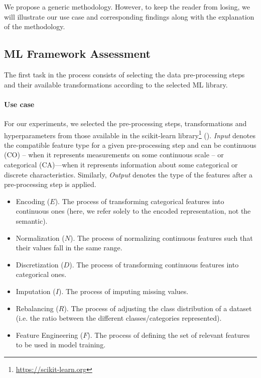 We propose a generic methodology.
However, to keep the reader from losing, we will illustrate our use case and corresponding findings along with the explanation of the methodology.

\subsection{ML Framework Assessment}
\label{effective-ssec:select-framework}

The first task in the process consists of selecting the data pre-processing steps and their available transformations according to the selected ML library.

\paragraph{Use case}
For our experiments, we selected the pre-processing steps, transformations and hyperparameters from those available in the scikit-learn library\footnote{\url{https://scikit-learn.org}} ().
\textit{Input} denotes the compatible feature type for a given pre-processing step and can be continuous (CO) -- when it represents measurements on some continuous scale -- or categorical (CA)---when it represents information about some categorical or discrete characteristics.
Similarly, \textit{Output} denotes the type of the features after a pre-processing step is applied.

\begin{itemize}[noitemsep,topsep=0pt]
\item{Encoding ($E$).} The process of transforming categorical features into continuous ones (here, we refer solely to the encoded representation, not the semantic).
\item{Normalization ($N$).} The process of normalizing continuous features such that their values fall in the same range.
\item{Discretization ($D$).} The process of transforming continuous features into categorical ones.
\item{Imputation ($I$).} The process of imputing missing values.
\item{Rebalancing ($R$).} The process of adjusting the class distribution of a dataset (i.e. the ratio between the different classes/categories represented).
\item{Feature Engineering ($F$).} The process of defining the set of relevant features to be used in model training.
\end{itemize}

